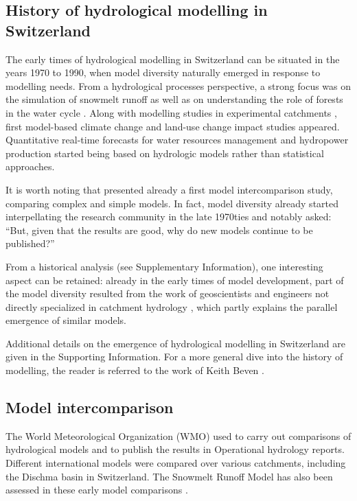 \documentclass[10pt,a4paper]{article}
\begin{document}
\subsection{History of hydrological modelling in Switzerland}
\label{sec:models:history}

The early times of hydrological modelling in Switzerland can be situated
in the years 1970 to 1990, when model diversity naturally emerged in
response to modelling needs. From a hydrological processes perspective,
a strong focus was on the simulation of snowmelt
runoff \citep{braun1986} as well as on understanding the role of
forests in the water cycle \citep{keller1991,forster1989}. Along with modelling
studies in experimental catchments \citep{Iorgulescu1994}, first model-based
climate change \citep{bultot1992a} and land-use change \citep{jordan1990a}
impact studies appeared. Quantitative real-time forecasts for water
resources management \citep{p1969} and hydropower
production \citep{jensenlang1973} started being based on hydrologic models
rather than statistical approaches.

It is worth noting that \citet{naef1977} presented already a first
model intercomparison study, comparing complex and simple models. In
fact, model diversity already started interpellating the research
community in the late 1970ties and \citet{f1981} notably asked:
``But, given that the results are good, why do new models continue to be
published?'' 

From a historical analysis (see Supplementary Information), one
interesting aspect can be retained: already in the early times of model
development, part of the model diversity resulted from the work of
geoscientists and engineers not directly specialized in catchment
hydrology \citep{Abednego1990,k1986a,hager1984,sautier1980}, which partly explains the parallel
emergence of similar models. 

Additional details on the emergence of hydrological modelling in
Switzerland are given in the Supporting Information. For a more general
dive into the history of modelling, the reader is referred to the work
of Keith Beven \citep{Beven_2020,Beven_2020a}.

\subsection{Model intercomparison}
\label{sec:models:intercomparison}

The World Meteorological Organization (WMO) used to carry out comparisons of hydrological models and to publish the results in Operational hydrology reports. Different international models were compared over various catchments, including the Dischma basin in Switzerland. The Snowmelt Runoff Model \citep[SRM,][see supplementary material]{martinec1975} has also been assessed in these early model comparisons \citep{WMO1986, WMO1992}.
\end{document}
